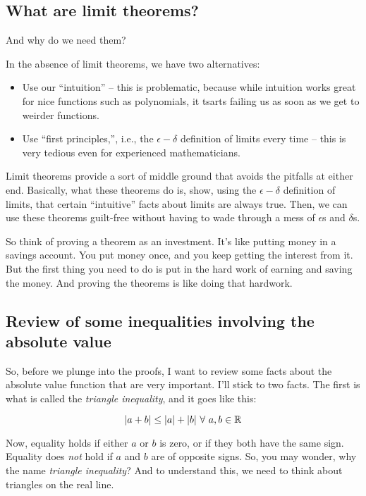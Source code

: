 \documentclass[10pt]{amsart}
\begin{document}
\subsection{What are limit theorems?}

And why do we need them?

In the absence of limit theorems, we have two alternatives:

\begin{itemize}
\item Use our ``intuition'' -- this is problematic, because while
  intuition works great for nice functions such as polynomials, it
  tsarts failing us as soon as we get to weirder functions.
\item Use ``first principles,'', i.e., the $\epsilon-\delta$
  definition of limits every time -- this is very tedious even for
  experienced mathematicians.
\end{itemize}

Limit theorems provide a sort of middle ground that avoids the
pitfalls at either end. Basically, what these theorems do is, show,
using the $\epsilon-\delta$ definition of limits, that certain
``intuitive'' facts about limits are always true. Then, we can use
these theorems guilt-free without having to wade through a mess of
$\epsilon$s and $\delta$s.

So think of proving a theorem as an investment. It's like putting
money in a savings account. You put money once, and you keep getting
the interest from it. But the first thing you need to do is put in the
hard work of earning and saving the money. And proving the theorems is
like doing that hardwork. 

\subsection{Review of some inequalities involving the absolute value}

So, before we plunge into the proofs, I want to review some facts
about the absolute value function that are very important. I'll stick
to two facts. The first is what is called the {\em triangle
inequality}, and it goes like this:

\begin{equation*}
  |a + b| \le |a| + |b| \ \forall \ a,b \in \mathbb{R}
\end{equation*}

Now, equality holds if either $a$ or $b$ is zero, or if they both have
the same sign. Equality does {\em not} hold if $a$ and $b$ are of
opposite signs. So, you may wonder, why the name {\em triangle
inequality}? And to understand this, we need to think about triangles
on the real line.
\end{document}
